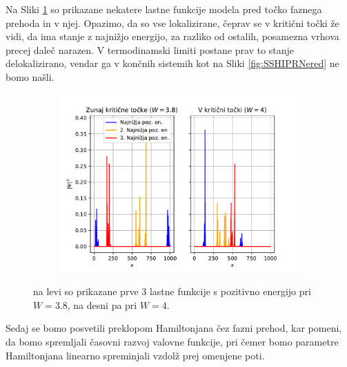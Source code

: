  Na Sliki \ref{fig:EigenPloti} so prikazane nekatere lastne funkcije modela pred točko faznega prehoda in v njej. Opazimo, da so vse lokalizirane, čeprav se v kritični točki že vidi, da ima stanje z najnižjo energijo, za razliko od ostalih, posamezna vrhova precej daleč narazen. V termodinamski limiti postane prav to stanje delokalizirano, vendar ga v končnih sistemih kot na Sliki \ref{fig:SSHIPRNered} ne bomo našli.
\begin{figure}[H]
\centering
\begin{subfigure}{.7\textwidth}
\includegraphics[trim=0 0 0 38,clip,width=\linewidth]{Figures/EigenPloti.pdf}
\end{subfigure}
\caption{na levi so prikazane prve 3 lastne funkcije s pozitivno energijo pri $W=3.8$, na desni pa pri $W=4$.}
\label{fig:EigenPloti}
\end{figure}

Sedaj se bomo posvetili preklopom Hamiltonjana čez fazni prehod, kar pomeni, da bomo spremljali časovni razvoj valovne funkcije, pri čemer bomo parametre Hamiltonjana linearno spreminjali vzdolž prej omenjene poti.

